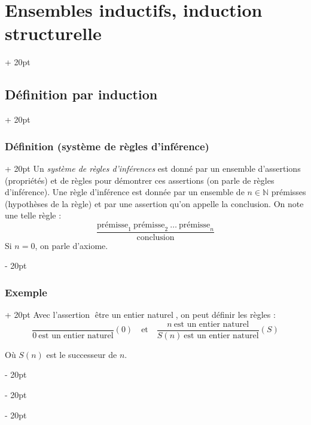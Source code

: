 \documentclass[a4paper, 12pt, twoside]{article}
\newcommand{\N}{\mathbb{N}} %
\newcommand{\simplecit}[1]{\guillemotleft$\;$#1$\;$\guillemotright}
\newcommand{\ind}[1][20pt]{\advance\leftskip + #1}
\newcommand{\deind}[1][20pt]{\advance\leftskip - #1}
\newenvironment{indt}[2][20pt]{#2 \par \ind[#1]}{\par \deind} %
\begin{document}
    \begin{indt}{\section{Ensembles inductifs, induction structurelle}}
        
        \begin{indt}{\subsection{Définition par induction}}
            \begin{indt}{\subsubsection{Définition (système de règles d'inférence)}}
                Un \textit{système de règles d'inférences} est donné par un ensemble d'assertions (propriétés) et de règles pour démontrer ces assertions (on parle de règles d'inférence).
                Une règle d'inférence est donnée par un ensemble de $n \in \N$ prémisses (hypothèses de la règle) et par une assertion qu'on appelle la conclusion. On note une telle règle :
                    \[ \dfrac{\text{prémisse}_1\ \text{prémisse}_2\ \ldots\ \text{prémisse}_n}{\text{conclusion}} \]
                Si $n = 0$, on parle d'axiome.
            \end{indt}
            
            \vspace{12pt}
            
            \begin{indt}{\subsubsection{Exemple}}
                Avec l'assertion \simplecit{être un entier naturel}, on peut définir les règles :
                    \[
                        \dfrac{}{0\ \text{est un entier naturel}} (0)
                        \quad \text{et} \quad
                        \dfrac{n\ \text{est un entier naturel}}{S(n)\ \text{est un entier naturel}} (S)
                    \]
                
                Où $S(n)$ est le successeur de $n$.
            \end{indt}
            
            \vspace{12pt}
            

\end{indt}
\end{indt}
\end{document}

